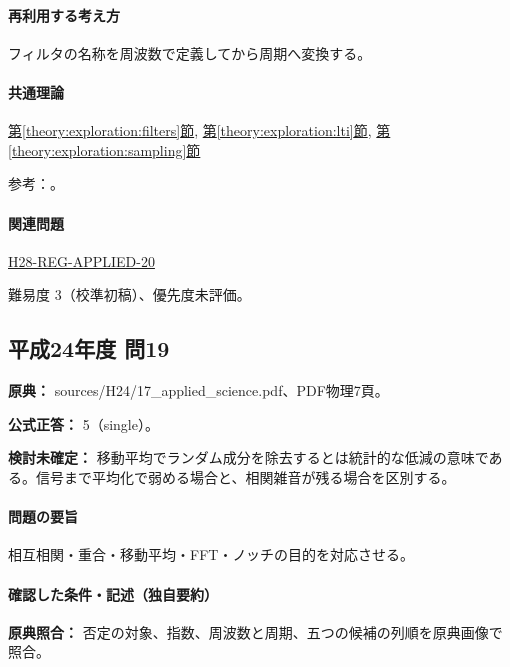 \paragraph{再利用する考え方} フィルタの名称を周波数で定義してから周期へ変換する。

\paragraph{共通理論} \hyperref[theory:exploration:filters]{第\ref*{theory:exploration:filters}節}, \hyperref[theory:exploration:lti]{第\ref*{theory:exploration:lti}節}, \hyperref[theory:exploration:sampling]{第\ref*{theory:exploration:sampling}節}

\par 参考：\cite{mit_signals2010,mit_moving2012,scipy_notch,scipy_fft,usgs_processing2000}。

\paragraph{関連問題} \hyperref[q:h28-reg-applied-20]{H28-REG-APPLIED-20}

\par 難易度 3（校準初稿）、優先度未評価。

\subsection{平成24年度 問19}
\label{q:h24-reg-applied-19}

\noindent\textbf{原典：} sources/H24/17\_applied\_science.pdf、PDF物理7頁。

\textbf{公式正答：} 5（single）。

\par\textbf{検討未確定：} 移動平均でランダム成分を除去するとは統計的な低減の意味である。信号まで平均化で弱める場合と、相関雑音が残る場合を区別する。

\paragraph{問題の要旨} 相互相関・重合・移動平均・FFT・ノッチの目的を対応させる。

\paragraph{確認した条件・記述（独自要約）}\mbox{}\par

\noindent\textbf{原典照合：} 否定の対象、指数、周波数と周期、五つの候補の列順を原典画像で照合。\par

